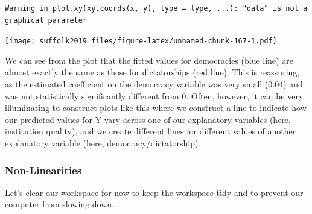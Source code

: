 \documentclass[]{article}
\newenvironment{Shaded}{\begin{snugshade}}{\end{snugshade}}
\newcommand{\DataTypeTok}[1]{\textcolor[rgb]{0.13,0.29,0.53}{#1}}
\newcommand{\KeywordTok}[1]{\textcolor[rgb]{0.13,0.29,0.53}{\textbf{#1}}}
\newcommand{\NormalTok}[1]{#1}
\newcommand{\OperatorTok}[1]{\textcolor[rgb]{0.81,0.36,0.00}{\textbf{#1}}}
\newcommand{\OtherTok}[1]{\textcolor[rgb]{0.56,0.35,0.01}{#1}}
\newcommand{\StringTok}[1]{\textcolor[rgb]{0.31,0.60,0.02}{#1}}
\begin{document}
\begin{Shaded}
\end{Shaded}

\begin{verbatim}
Warning in plot.xy(xy.coords(x, y), type = type, ...): "data" is not a
graphical parameter
\end{verbatim}

\texttt{[image: suffolk2019\_files/figure-latex/unnamed-chunk-167-1.pdf]}

We can see from the plot that the fitted values for democracies (blue line) are almost exactly the same as those for dictatorships (red line). This is reassuring, as the estimated coefficient on the democracy variable was very small (0.04) and was not statistically significantly different from 0. Often, however, it can be very illuminating to construct plots like this where we construct a line to indicate how our predicted values for Y vary across one of our explanatory variables (here, institution quality), and we create different lines for different values of another explanatory variable (here, democracy/dictatorship).

\hypertarget{non-linearities}{%
\subsubsection{Non-Linearities}\label{non-linearities}}

Let's clear our workspace for now to keep the workspace tidy and to prevent our computer from slowing down.
\end{document}
